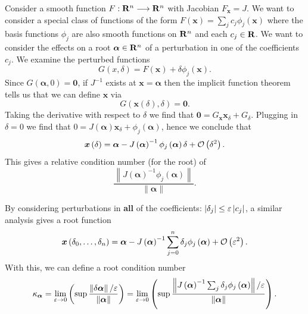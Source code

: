 Consider a smooth function \(F: \mathbf{R}^n \longrightarrow \mathbf{R}^n\)
with Jacobian \(F_{\bm{x}} = J\). We want to consider a special class of
functions of the form \(F\left(\bm{x}\right) = \sum_j c_j
\phi_j\left(\bm{x}\right)\) where the basis
functions \(\phi_j\) are also smooth functions on \(\mathbf{R}^n\)
and each \(c_j \in \mathbf{R}\). We want to consider the effects on a root
\(\bm{\alpha} \in \mathbf{R}^n\) of a perturbation in one of the
coefficients \(c_j\). We examine the perturbed functions
\begin{equation}
G(x, \delta) = F\left(\bm{x}\right) + \delta \phi_j\left(\bm{x}\right).
\end{equation}
Since \(G\left(\bm{\alpha}, 0\right) = \bm{0}\), if \(J^{-1}\) exists at
\(\bm{x} = \bm{\alpha}\) then
the implicit function theorem tells us that we can define
\(\bm{x}\) via
\begin{equation}
G\left(\bm{x}\left(\delta\right), \delta\right) = \bm{0}.
\end{equation}
Taking the derivative with respect to \(\delta\) we find that
\(\bm{0} = G_{\bm{x}} \bm{x}_{\delta} + G_{\delta}\). Plugging in
\(\delta = 0\) we find that \(0 = J\left(\bm{\alpha}\right) \bm{x}_{\delta} +
\phi_j\left(\bm{\alpha}\right)\), hence we
conclude that
\begin{equation}
\bm{x}\left(\delta\right) = \bm{\alpha} - J\left(\bm{\alpha}\right)^{-1}
  \phi_j\left(\bm{\alpha}\right) \delta + \mathcal{O}\left(\delta^2\right).
\end{equation}
This gives a relative condition number (for the root) of
\begin{equation}
\frac{\left \lVert J\left(\bm{\alpha}\right)^{-1}
  \phi_j\left(\bm{\alpha}\right) \right \rVert}{
  \left \lVert \bm{\alpha} \right \rVert}.
\end{equation}

By considering perturbations in \textbf{all} of the coefficients:
\(\left|\delta_j\right| \leq \varepsilon \left|c_j\right|\), a similar analysis
gives a root function
\begin{equation}
\bm{x}\left(\delta_0, \ldots, \delta_n\right) = \bm{\alpha} -
  J\left(\bm{\alpha}\right)^{-1} \sum_{j = 0}^n \delta_j
  \phi_j\left(\bm{\alpha}\right) + \mathcal{O}\left(\varepsilon^2\right).
\end{equation}
With this, we can define a root condition number
\begin{equation}
\kappa_{\bm{\alpha}} =
  \lim_{\varepsilon \to 0} \left(\sup \frac{\left \lVert\delta \bm{\alpha}
  \right \rVert / \varepsilon}{\left \lVert\bm{\alpha}\right \rVert}\right) =
  \lim_{\varepsilon \to 0} \left(\sup \frac{\left \lVert
  J\left(\bm{\alpha}\right)^{-1} \sum_j \delta_j
  \phi_j\left(\bm{\alpha}\right) \right \rVert / \varepsilon}{
  \left \lVert\bm{\alpha}\right \rVert}\right).
\end{equation}


